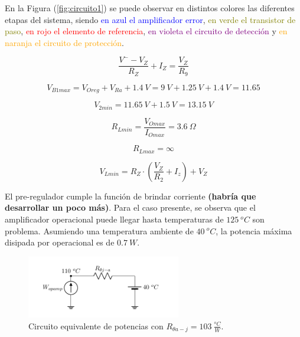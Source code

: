 En la Figura (\ref{fig:circuito1}) se puede observar en distintos colores las diferentes etapas del sistema, siendo \textcolor{blue}{en azul el amplificador error}, \textcolor{olive}{en verde el transistor de paso}, \textcolor{red}{en rojo el elemento de referencia}, \textcolor{purple}{en violeta el circuito de detección} y \textcolor{orange}{en naranja el circuito de protección}.

\begin{equation}
\frac{V^- - V_Z}{R_Z} + I_Z = \frac{V_Z}{R_9}
\end{equation}

\begin{equation}
V_{B1max} = V_{Oreg} + V_{Ra} + 1.4 \ V = 9 \ V + 1.25 \ V + 1.4 \ V = 11.65
\end{equation}

\begin{equation}
V_{2min} = 11.65 \ V + 1.5 \ V = 13.15 \ V
\end{equation}

\begin{equation}
	R_{Lmin} = \frac{V_{Omax}}{I_{Omax}} = 3.6 \ \Omega
\end{equation}

\begin{equation}
	R_{Lmax} = \infty
\end{equation}

\begin{equation}
	V_{Lmin} = R_Z \cdot \left( \frac{V_Z}{R_2} + I_z \right) + V_Z
\end{equation}

El pre-regulador cumple la función de brindar corriente \textbf{(habría que desarrollar un poco más)}. Para el caso presente, se observa que el amplificador operacional puede llegar hasta temperaturas de $125 \ ^o C$ son problema. Asumiendo una temperatura ambiente de $40 \ ^o C$, la potencia máxima disipada por operacional es de $0.7 \ W$.
\begin{figure}[H]
\centering
	\includegraphics[width=0.6\textwidth, page=1]{ImagenesEjercicio2/Potencia - Opamp.pdf}
	\caption{Circuito equivalente de potencias con $R_{\theta a-j} = 103 \ \frac{^o C}{W}$.}
	\label{fig:circuitopot}
\end{figure}

